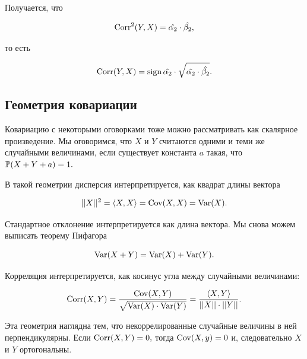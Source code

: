 \documentclass[12pt, a4paper, oneside]{article}
\begin{document}
\begin{itemize}
Получается, что 

\[
\operatorname{Corr}^2(Y, X) = \hat{\alpha_2} \cdot \hat{\beta_2},
\]

то есть 

\[
\operatorname{Corr}(Y, X) = \operatorname{sign}{\hat{\alpha_2}} \cdot \sqrt{\hat{\alpha_2} \cdot \hat{\beta_2}}.
\]

\end{itemize} 


\subsection{Геометрия ковариации}

Ковариацию с некоторыми оговорками тоже можно рассматривать как скалярное произведение. Мы оговоримся, что $X$ и $Y$ считаются одними и теми же случайными величинами, если существует константа $a$ такая, что $\mathbb{P}(X + Y + a) = 1.$

В такой геометрии дисперсия интерпретируется, как квадрат длины вектора

\[ 
||X||^2 = \langle X,X \rangle = \operatorname{Cov}(X, X) = \operatorname{Var}(X). 
\]

Стандартное отклонение интерпретируется как длина вектора. Мы снова можем выписать теорему Пифагора

\[
\operatorname{Var}(X + Y) = \operatorname{Var}(X) + \operatorname{Var}(Y).
\]


\begin{center} 
\end{center} 

Корреляция интерпретируется, как косинус угла между случайными величинами: 

\[
\operatorname{Corr}(X, Y) = \frac{\operatorname{Cov}(X,Y)}{\sqrt{\operatorname{Var}(X) \cdot \operatorname{Var}(Y)}} =  \frac{\langle X,Y \rangle}{||X|| \cdot ||Y||}.
\]

Эта геометрия наглядна тем, что некоррелированные случайные величины в ней перпендикулярны. Если $\operatorname{Corr}(X,Y) = 0,$ тогда $\operatorname{Cov}(X,y)=0$ и, следовательно $X$ и $Y$ ортогональны. 
\end{document}
